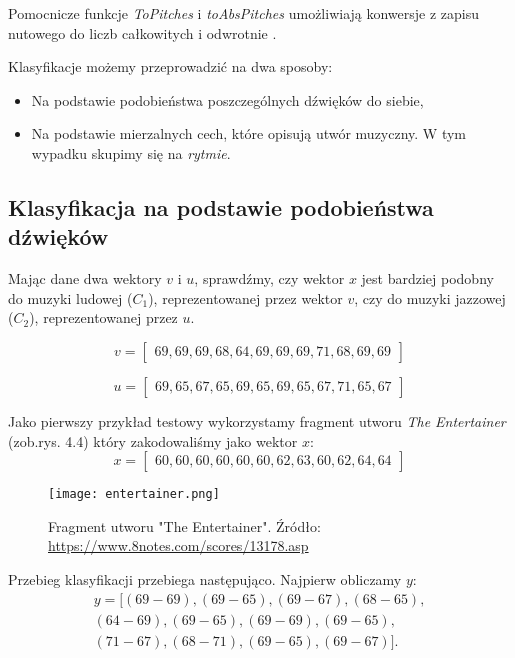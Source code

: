 Pomocnicze funkcje \textit{ToPitches} i \textit{toAbsPitches} umożliwiają konwersje z  zapisu nutowego do liczb całkowitych i odwrotnie \citep[s. 60]{HSOM_2018}.

Klasyfikacje możemy przeprowadzić na dwa sposoby:
\begin{itemize}
    \item Na podstawie podobieństwa poszczególnych dźwięków do siebie,
    \item Na podstawie mierzalnych cech, które opisują utwór muzyczny. W tym wypadku skupimy się na \textit{rytmie}.
\end{itemize}

\subsection{Klasyfikacja na podstawie podobieństwa dźwięków}
Mając dane dwa wektory $v$ i $u$, sprawdźmy, czy wektor $x$ jest bardziej podobny do muzyki ludowej ($C_{1}$), reprezentowanej przez wektor $v$, czy do muzyki jazzowej ($C_{2}$), reprezentowanej przez $u$. 

\begin{equation*}
v =
\begin{bmatrix}
69,69,69,68,64,69,69,69,71,68,69,69
\end{bmatrix}
\end{equation*}

\begin{equation*}
    u =
    \begin{bmatrix}
    69,65,67,65,69,65,69,65,67,71,65,67
    \end{bmatrix}
\end{equation*}

Jako pierwszy przykład testowy wykorzystamy fragment utworu \textit{The Entertainer} (zob.rys. 4.4) który zakodowaliśmy jako wektor $x$:
\begin{equation*}
x =
    \begin{bmatrix}
   60,60,60,60,60,60,62,63,60,62,64,64
    \end{bmatrix}
\end{equation*}

\begin{figure}[H]
\texttt{[image: entertainer.png]}
\centering
\caption{Fragment utworu "The Entertainer". Źródło: \url{https://www.8notes.com/scores/13178.asp}}
\centering
\end{figure}

Przebieg klasyfikacji przebiega następująco. Najpierw obliczamy $y$:
\begin{align*}
y = [(69 - 69), (69 - 65), (69 - 67), (68 - 65), \\ (64 - 69), 
(69 - 65), (69 - 69), (69 - 65),\\ (71 - 67), (68 - 71), (69 - 65), (69 - 67)].
\end{align*}

